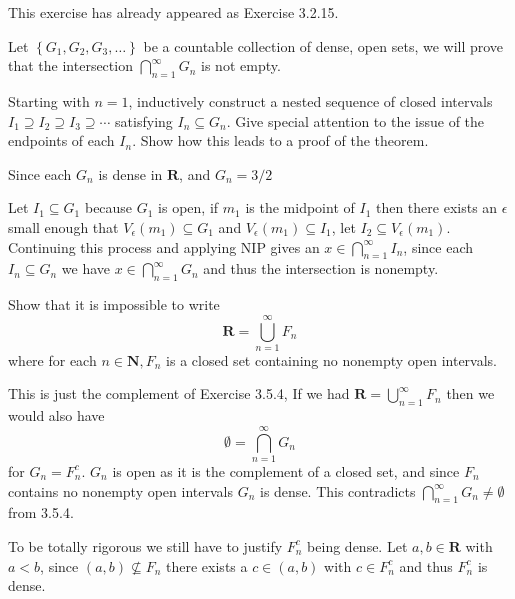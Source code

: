 \begin{solution}
  This exercise has already appeared as Exercise 3.2.15.
\end{solution}

\begin{exercise}
  Let $\left\{G_{1}, G_{2}, G_{3}, \ldots\right\}$ be a countable collection of dense, open sets, we will prove that the intersection $\bigcap_{n=1}^{\infty} G_{n}$ is not empty.

  Starting with $n=1$, inductively construct a nested sequence of closed intervals $I_{1} \supseteq I_{2} \supseteq I_{3} \supseteq \cdots$ satisfying $I_{n} \subseteq G_{n}$. Give special attention to the issue of the endpoints of each $I_{n}$. Show how this leads to a proof of the theorem.
\end{exercise}

\begin{solution}
  Since each $G_n$ is dense in $\mathbf R$, and $G_n = 3/2$

  Let $I_1 \subseteq G_1$ because $G_1$ is open, if $m_1$ is the midpoint of $I_1$ then there exists an $\epsilon$ small enough that $V_\epsilon(m_1) \subseteq G_1$ and $V_\epsilon(m_1) \subseteq I_1$, let $I_2 \subseteq V_\epsilon(m_1)$. Continuing this process and applying NIP gives an $x \in \bigcap_{n=1}^\infty I_n$, since each $I_n \subseteq G_n$ we have $x \in \bigcap_{n=1}^\infty G_n$ and thus the intersection is nonempty.
\end{solution}

\begin{exercise}
  Show that it is impossible to write
  $$
  \mathbf{R}=\bigcup_{n=1}^{\infty} F_{n}
  $$
  where for each $n \in \mathbf{N}, F_{n}$ is a closed set containing no nonempty open intervals.
\end{exercise}

\begin{solution}
  This is just the complement of Exercise 3.5.4, If we had $\mathbf R = \bigcup_{n=1}^\infty F_n$ then we would also have
  $$\emptyset = \bigcap_{n=1}^\infty G_n$$
  for $G_n = F_n^c$. $G_n$ is open as it is the complement of a closed set, and since $F_n$ contains no nonempty open intervals $G_n$ is dense. This contradicts $\bigcap_{n=1}^\infty G_n \ne \emptyset$  from 3.5.4.

  To be totally rigorous we still have to justify $F_n^c$ being dense. Let $a,b \in \mathbf{R}$ with $a < b$, since $(a,b) \not \subseteq F_n$ there exists a $c \in (a,b)$ with $c \in F_n^c$ and thus $F_n^c$ is dense.
\end{solution}
